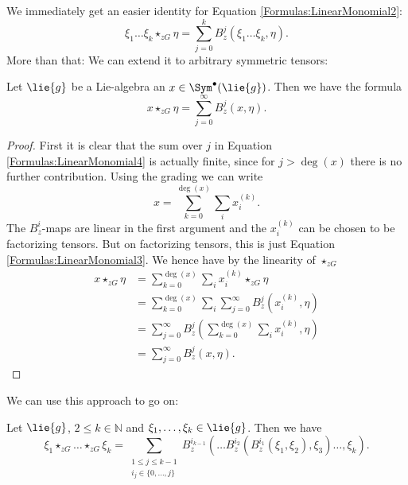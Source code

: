We immediately get an easier identity for Equation 
\eqref{Formulas:LinearMonomial2}:
\begin{equation}\label{Formulas:LinearMonomial3}
	\xi_1 \ldots \xi_k \star_{zG} \eta
	=
	\sum\limits_{j = 0}^k
	B_z^j(\xi_1 \ldots \xi_k, \eta).
\end{equation}
More than that: We can extend it to 
arbitrary symmetric tensors:
\begin{lemma}
	\label{Lemma:LinearMonomial4}
	Let $\lie{g}$ be a Lie-algebra an $x \in \Sym^{\bullet}(\lie{g})$. 
	Then we have the formula
	\begin{equation}
		\label{Formulas:LinearMonomial4}
		x \star_{zG} \eta
    	=
    	\sum\limits_{j=0}^{\infty}
    	B_z^j(x, \eta).
	\end{equation}
\end{lemma}
\begin{proof}
	First it is clear that the sum over $j$ in Equation 
	\eqref{Formulas:LinearMonomial4} is actually finite, since for $j 
	> \deg(x)$ there is no further contribution. Using the grading we 
	can write
	\begin{equation*}
		x 
		= 
		\sum\limits_{k=0}^{\deg(x)}
		\sum_i x_i^{(k)}.
	\end{equation*}
	The $B_z^i$-maps are linear in the first argument and the 
	$x_i^{(k)}$ can be chosen to be factorizing tensors. But on 
	factorizing tensors, this is just Equation 
	\eqref{Formulas:LinearMonomial3}. We hence have by the linearity 
	of $\star_{zG}$
	\begin{align*}
		x \star_{zG} \eta
		& =
		\sum\limits_{k=0}^{\deg(x)}
		\sum_i 
		x_i^{(k)}
		\star_{zG} \eta
		\\
		& =
		\sum\limits_{k=0}^{\deg(x)}
		\sum_i 
		\sum\limits_{j=0}^{\infty}
    	B_z^j \left( x_i^{(k)}, \eta \right)
		\\
		& =
		\sum\limits_{j=0}^{\infty}
    	B_z^j
    	\left(
			\sum\limits_{k=0}^{\deg(x)}
			\sum_i 
			x_i^{(k)}, \eta
		\right)
		\\
		& =
    	\sum\limits_{j=0}^{\infty}
    	B_z^j(x, \eta).
	\end{align*}
\end{proof}
We can use this approach to go on:
\begin{proposition}
	\label{Prop:Formulas:MultipleStars}
	Let $\lie{g}$, $2 \leq k \in \mathbb{N}$  and $\xi_1, \ldots, \xi_k 
	\in \lie{g}$. Then we have
	\begin{equation}\label{Formulas:MultipleStars}
		\xi_1 \star_{zG} \ldots \star_{zG} \xi_k		
		=
		\sum\limits_{\substack{
			1 \leq j \leq k-1 \\
			i_j \in \{0, \ldots, j\}
		}}
		B_z^{i_{k-1}}
		\left(
			\ldots B_z^{i_2}
			\left(
				B_z^{i_1} 
				\left( \xi_1, \xi_2 \right)
				, \xi_3	
			\right) 
			\ldots, \xi_{k}
		\right).
	\end{equation}
\end{proposition}
